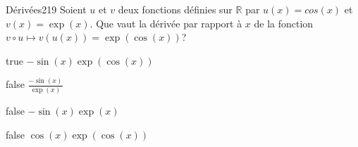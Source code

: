         	\begin{question}{25}{Dérivées}{2}{19}
				Soient $u$ et $v$ deux fonctions définies sur $\mathbb{R}$ par $u(x) = cos(x)$ et $v(x) = \exp(x)$. Que vaut la dérivée par rapport à $x$ de la fonction $v\circ u \mapsto v(u(x)) = \exp(\cos(x))$?
            \end{question}
            \begin{reponses}
            	\item[true] $-\sin(x)\exp(\cos(x))$
            	\item[false] $\frac{-\sin(x)}{\exp(x)}$
                \item[false] $-\sin(x)\exp(x)$
                \item[false] $\cos(x)\exp(\cos(x))$
            \end{reponses}
